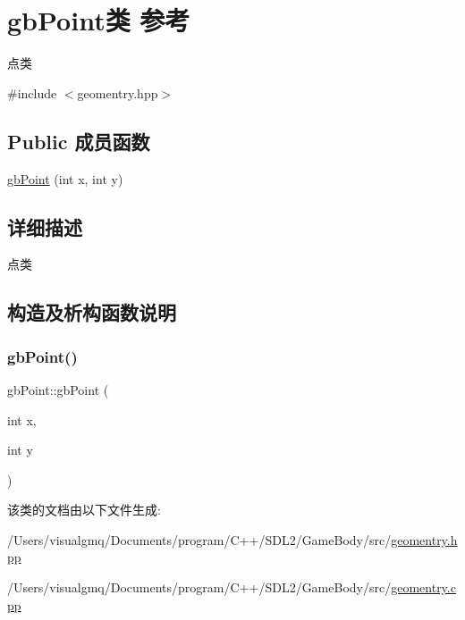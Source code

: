 \hypertarget{classgb_point}{}\section{gb\+Point类 参考}
\label{classgb_point}


点类  




{\ttfamily \#include $<$geomentry.\+hpp$>$}

\subsection*{Public 成员函数}
\begin{DoxyCompactItemize}
\item 
\mbox{\hyperlink{classgb_point_a996a435065205fc3122ee264d30e1b87}{gb\+Point}} (int x, int y)
\end{DoxyCompactItemize}


\subsection{详细描述}
点类 

\subsection{构造及析构函数说明}
\mbox{\label{classgb_point_a996a435065205fc3122ee264d30e1b87}} 
\subsubsection{\texorpdfstring{gbPoint()}{gbPoint()}}
{\footnotesize\ttfamily gb\+Point\+::gb\+Point (\begin{DoxyParamCaption}\item[{int}]{x,  }\item[{int}]{y }\end{DoxyParamCaption})}



该类的文档由以下文件生成\+:\begin{DoxyCompactItemize}
\item 
/\+Users/visualgmq/\+Documents/program/\+C++/\+S\+D\+L2/\+Game\+Body/src/\mbox{\hyperlink{geomentry_8hpp}{geomentry.\+hpp}}\item 
/\+Users/visualgmq/\+Documents/program/\+C++/\+S\+D\+L2/\+Game\+Body/src/\mbox{\hyperlink{geomentry_8cpp}{geomentry.\+cpp}}\end{DoxyCompactItemize}
